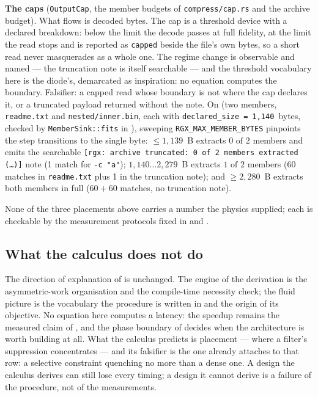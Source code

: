 \documentclass[11pt,letterpaper]{article}
\begin{document}
\textbf{The caps} (\texttt{OutputCap}, the member budgets of
\texttt{compress/cap.rs} and the archive budget). What flows is decoded
bytes. The cap is a threshold device with a declared breakdown: below
the limit the decode passes at full fidelity, at the limit the read
stops and is reported as \texttt{capped} beside the file's own bytes,
so a short read never masquerades as a whole one. The regime change is
observable and named --- the truncation note is itself searchable ---
and the threshold vocabulary here is the diode's, demarcated as
inspiration: no equation computes the boundary. Falsifier: a capped
read whose boundary is not where the cap declares it, or a truncated
payload returned without the note. On
 (two members,
\texttt{readme.txt} and \texttt{nested/inner.bin}, each with
\texttt{declared\_size = 1{,}140}~bytes, checked by
\texttt{MemberSink::fits} in
), sweeping
\texttt{RGX\_MAX\_MEMBER\_BYTES} pinpoints the step transitions to the
single byte: $\le 1{,}139$~B extracts $0\text{ of }2$ members and emits
the searchable \texttt{[rgx: archive truncated: 0 of 2 members extracted
(\dots)]} note (1 match for \texttt{-c "a"}); $1{,}140\dots 2{,}279$~B
extracts $1\text{ of }2$ members (60 matches in \texttt{readme.txt} plus
1 in the truncation note); and $\ge 2{,}280$~B extracts both members in
full ($60 + 60$ matches, no truncation note).

None of the three placements above carries a number the physics
supplied; each is checkable by the measurement protocols fixed in
 and .

\subsection{What the calculus does not do}
\label{sec:calculus:limits}
The direction of explanation of  is unchanged. The
engine of the derivation is the asymmetric-work organisation and the
compile-time necessity check; the fluid picture is the vocabulary the
procedure is written in and the origin of its objective. No equation here
computes a latency: the speedup remains the measured claim of
, and the phase boundary of  decides
when the architecture is worth building at all. What the calculus
predicts is placement --- where a filter's suppression concentrates ---
and its falsifier is the one  already attaches to that
row: a selective constraint quenching no more than a dense one. A design
the calculus derives can still lose every timing; a design it cannot
derive is a failure of the procedure, not of the measurements.
\end{document}
